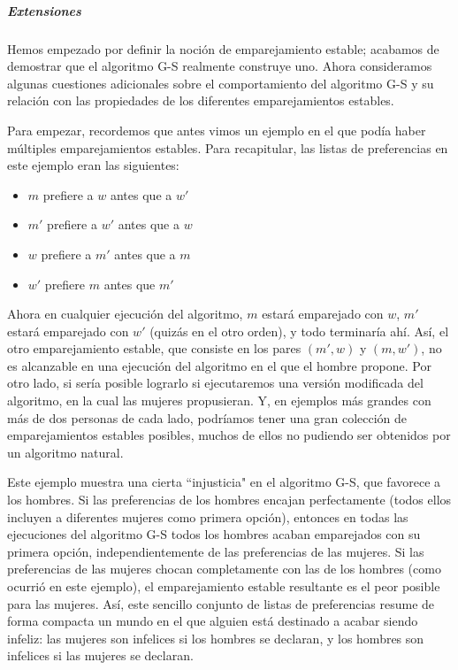 \documentclass[a4paper, 12pt]{book}
\theoremstyle{dotless}
\begin{document}
\subparagraph{Extensiones}

Hemos empezado por definir la noción de emparejamiento estable; acabamos de demostrar que el algoritmo G-S realmente construye uno. Ahora consideramos algunas cuestiones adicionales sobre el comportamiento del algoritmo G-S y su relación con las propiedades de los diferentes emparejamientos estables.

Para empezar, recordemos que antes vimos un ejemplo en el que podía haber múltiples emparejamientos estables. Para recapitular, las listas de preferencias en este ejemplo eran las siguientes:

\begin{itemize}
  \item $m$ prefiere a $w$ antes que a $w'$
  \item $m'$ prefiere a $w'$ antes que a $w$
  \item $w$ prefiere a $m'$ antes que a $m$
  \item $w'$ prefiere $m$ antes que $m'$
\end{itemize}

Ahora en cualquier ejecución del algoritmo, $m$ estará emparejado con $w$, $m'$ estará emparejado con $w'$ (quizás en el otro orden), y todo terminaría ahí. Así, el otro emparejamiento estable, que consiste en los pares $(m',w)$ y $(m,w')$, no es alcanzable en una ejecución del algoritmo en el que el hombre propone. Por otro lado, si sería posible lograrlo si ejecutaremos una versión modificada del algoritmo, en la cual las mujeres propusieran. Y, en ejemplos más grandes con más de dos personas de cada lado, podríamos tener una gran colección de emparejamientos estables posibles, muchos de ellos no pudiendo ser obtenidos por un algoritmo natural.

Este ejemplo muestra una cierta ``injusticia" en el algoritmo G-S, que favorece a los hombres. Si las preferencias de los hombres encajan perfectamente (todos ellos incluyen a diferentes mujeres como primera opción), entonces en todas las ejecuciones del algoritmo G-S todos los hombres acaban emparejados
con su primera opción, independientemente de las preferencias de las mujeres. Si las preferencias de las mujeres chocan completamente con las de los hombres (como ocurrió en este ejemplo), el emparejamiento estable resultante es el peor posible para las mujeres. Así, este sencillo conjunto de listas de preferencias resume de forma compacta un mundo en el que alguien está destinado a acabar siendo infeliz: las mujeres son infelices si los hombres se declaran, y los hombres son infelices si las mujeres se declaran.
\end{document}
